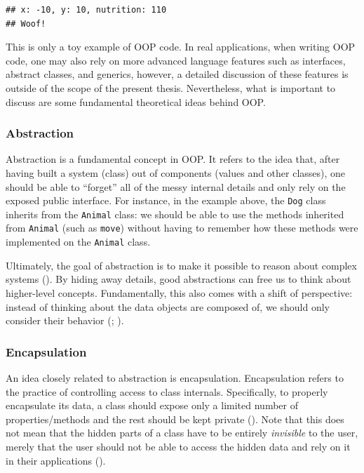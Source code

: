 \documentclass[
]{book}
\theoremstyle{definition}
\theoremstyle{definition}
\theoremstyle{definition}
\theoremstyle{definition}
\theoremstyle{remark}
\begin{document}
\begin{verbatim}
## x: -10, y: 10, nutrition: 110
## Woof!
\end{verbatim}

This is only a toy example of OOP code. In real applications, when writing OOP code, one may also rely on more advanced language features such as interfaces, abstract classes, and generics, however, a detailed discussion of these features is outside of the scope of the present thesis. Nevertheless, what is important to discuss are some fundamental theoretical ideas behind OOP.

\subsubsection{Abstraction}\label{abstraction}

Abstraction is a fundamental concept in OOP. It refers to the idea that, after having built a system (class) out of components (values and other classes), one should be able to ``forget'' all of the messy internal details and only rely on the exposed public interface. For instance, in the example above, the \texttt{Dog} class inherits from the \texttt{Animal} class: we should be able to use the methods inherited from \texttt{Animal} (such as \texttt{move}) without having to remember how these methods were implemented on the \texttt{Animal} class.

Ultimately, the goal of abstraction is to make it possible to reason about complex systems (). By hiding away details, good abstractions can free us to think about higher-level concepts. Fundamentally, this also comes with a shift of perspective: instead of thinking about the data objects are composed of, we should only consider their behavior (; ).

\subsubsection{Encapsulation}\label{encapsulation}

An idea closely related to abstraction is encapsulation. Encapsulation refers to the practice of controlling access to class internals. Specifically, to properly encapsulate its data, a class should expose only a limited number of properties/methods and the rest should be kept private (). Note that this does not mean that the hidden parts of a class have to be entirely \emph{invisible} to the user, merely that the user should not be able to access the hidden data and rely on it in their applications ().
\end{document}
